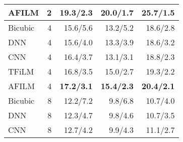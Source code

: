 \documentclass{article}
\begin{document}
\begin{table}[h]
\begin{tabular}{|l|r|r|r|r|}
    AFILM   & 2                          & 19.3\textbf{/2.3}                                                                          & \textbf{20.0/1.7}                                                                         & \textbf{25.7/1.5}                        \\ \hline
    Bicubic & 4                          & 15.6/5.6                                                                     & 13.2/5.2                                                                    & 18.6/2.8                   \\
    DNN \cite{li2015dnn}   & 4                          & 15.6/4.0                                                                     & 13.3/3.9                                                                    & 18.6/3.2                   \\
    CNN \cite{kuleshov2017audio}      & 4                          & 16.4/3.7                                                                     & 13.1/3.1                                                                    & 18.8/2.3                   \\
    TFiLM \cite{birnbaum2019temporal} & 4                          & 16.8/3.5                                                                     & 15.0/2.7                                                                    & 19.3/2.2                   \\
    AFILM   & 4                          & \textbf{17.2/3.1}                                                                          & \textbf{15.4/2.3}                                                                         & \textbf{20.4/2.1}                        \\ \hline
    Bicubic & 8                          & 12.2/7.2                                                                     & 9.8/6.8                                                                     & 10.7/4.0                   \\
    DNN \cite{li2015dnn}   & 8                          & 12.3/4.7                                                                     & 9.8/4.6                                                                     & 10.7/3.5                   \\
    CNN \cite{kuleshov2017audio}     & 8                          & 12.7/4.2                                                                     & 9.9/4.3                                                                     & 11.1/2.7                   \\

\end{tabular}
\end{table}
\end{document}
